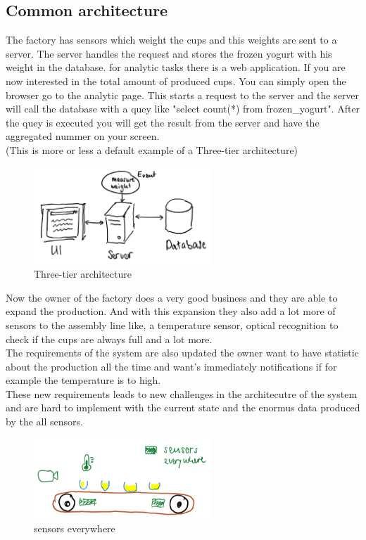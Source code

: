 \subsection{Common architecture}
The factory has sensors which weight the cups and this weights are sent to a server.
The server handles the request and stores the frozen yogurt with his weight in the database.
for analytic tasks there is a web application. If you are now interested in the total amount of produced cups.
You can simply open the browser go to the analytic page.
This starts a request to the server and the server will call the database with a quey like "select count(*) from frozen\_yogurt".
After the quey is executed you will get the result from the server and have the aggregated nummer on your screen.\\
(This is more or less a default example of a Three-tier architecture)

\begin{figure}[H]
\centering
\captionsetup{justification=centering}
\includegraphics[width=0.6\textwidth]{images/three_tier.png}
\caption[Three-tier architecture]{Three-tier architecture}
\end{figure}

\newpage

Now the owner of the factory does a very good business and they are able to expand the production.
And with this expansion they also add a lot more of sensors to the assembly line like, a temperature sensor,
optical recognition to check if the cups are always full and a lot more.\\
The requirements of the system are also updated the owner want to have statistic about the production all the time
and want's immediately notifications if for example the temperature is to high.\\
These new requirements leads to new challenges in the architecutre of the system and are hard to implement with the
current state and the enormus data produced by the all sensors.

\begin{figure}[H]
\centering
\captionsetup{justification=centering}
\includegraphics[width=0.6\textwidth]{images/sensors.png}
\caption[sensors everywhere]{sensors everywhere}
\end{figure}

